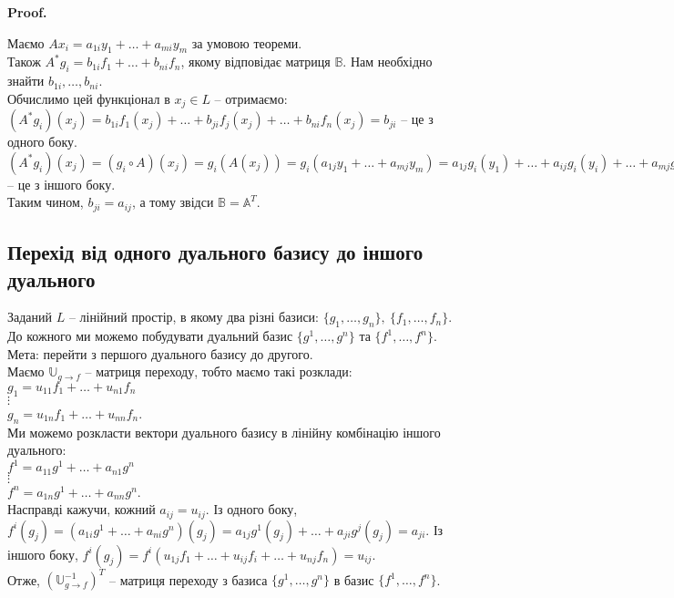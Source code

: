 \documentclass[a4paper, 10pt]{article}
\makeatletter
\theoremstyle{theoremdd}
\renewenvironment{proof}[1][Proof.\\]{\par
\pushQED{\hfill \qed}%
\normalfont \topsep6\p@\@plus6\p@\relax
\trivlist
\item\relax
{\bfseries
#1\@addpunct{.}}\hspace\labelsep\ignorespaces
}{%
\popQED\endtrivlist\@endpefalse
}
\makeatother
\begin{document}
\begin{proof}
Маємо $A x_i = a_{1i}y_1 + \dots + a_{mi}y_m$ за умовою теореми.\\
Також $A^* g_i = b_{1i}f_1 + \dots + b_{ni}f_n$, якому відповідає матриця $\mathbb{B}$. Нам необхідно знайти $b_{1i},\dots,b_{ni}$.\\
Обчислимо цей функціонал в $x_j \in L$ -- отримаємо:\\
$(A^* g_i)(x_j) = b_{1i}f_1(x_j) + \dots + b_{ji}f_j(x_j) + \dots + b_{ni}f_n(x_j) = b_{ji}$ -- це з одного боку.\\
$(A^* g_i)(x_j) = (g_i \circ A)(x_j) = g_i(A(x_j)) = g_i(a_{1j}y_1 + \dots + a_{mj}y_m) = a_{1j}g_i(y_1) + \dots + a_{ij}g_i(y_i) + \dots + a_{mj}g_i(y_m) = a_{ij}$ -- це з іншого боку.\\
Таким чином, $b_{ji} = a_{ij}$, а тому звідси $\mathbb{B} = \mathbb{A}^T$.
\end{proof}

\subsection{Перехід від одного дуального базису до іншого дуального}
Заданий $L$ -- лінійний простір, в якому два різні базиси: $\{g_1,\dots,g_n\},\ \{f_1,\dots,f_n\}$. До кожного ми можемо побудувати дуальний базис $\{g^1,\dots,g^n\}$ та $\{f^1,\dots,f^n\}$.\\
Мета: перейти з першого дуального базису до другого.\\
Маємо $\mathbb{U}_{g \to f}$ -- матриця переходу, тобто маємо такі розклади:\\
$g_1 = u_{11} f_1 + \dots + u_{n1} f_n$\\
$\vdots$\\
$g_n = u_{1n} f_1 + \dots + u_{nn} f_n$.\\
Ми можемо розкласти вектори дуального базису в лінійну комбінацію іншого дуального:\\
$f^1 = a_{11}g^1 + \dots + a_{n1}g^n$\\
$\vdots$\\
$f^n = a_{1n}g^1 + \dots + a_{nn}g^n$.\\
Насправді кажучи, кожний $a_{ij} = u_{ij}$. Із одного боку, $f^i(g_j) = (a_{1i}g^1 + \dots + a_{ni}g^n)(g_j) = a_{1j}g^1(g_j) + \dots + a_{ji} g^j(g_j) = a_{ji}$. Із іншого боку, $f^i(g_j) = f^i(u_{1j}f_1 + \dots + u_{ij}f_i + \dots + u_{nj}f_n) = u_{ij}$.
\bigskip \\
Отже, $(\mathbb{U}_{g \to f}^{-1})^T$ -- матриця переходу з базиса $\{g^1,\dots,g^n\}$ в базис $\{f^1,\dots,f^n\}$.
\end{document}
